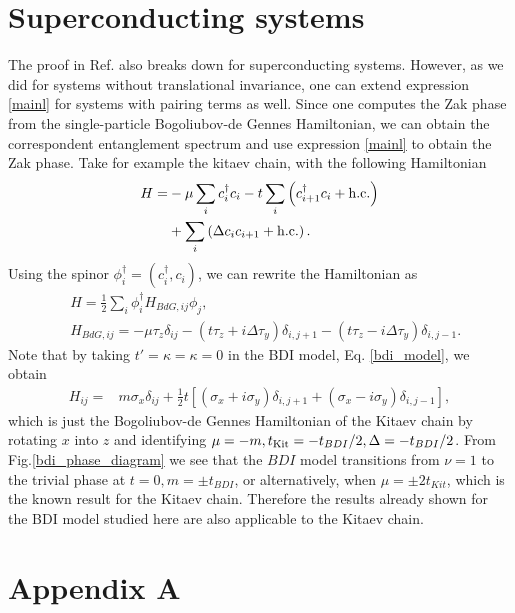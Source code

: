 \documentclass[twocolumn,amsmath,longbibliography,amssymb,superscriptaddress]{revtex4-1}
\begin{document}
\section{Superconducting systems}

The proof in Ref.\cite{Zaletel2014} also breaks down for superconducting systems. However, as we did for systems without translational invariance, one can extend expression \ref{mainl} for systems with pairing terms as well. Since one computes the Zak phase from the single-particle Bogoliubov-de Gennes Hamiltonian, we can obtain the correspondent entanglement spectrum and use expression \ref{mainl} to obtain the Zak phase. Take for example the kitaev chain, with the following Hamiltonian
\begin{align*}
H =& -\mu \sum_{i} c_i^\dagger c_i - t \sum_{i}\left( c_{i+1}^\dagger c_i + {\rm h.c.}\right) \\
&+  \sum_{i}\left( \Delta c_{i} c_{i+1} + {\rm h.c.}\right).
\end{align*}
Using the spinor $\phi_i^\dagger = (c_i^\dagger, c_i)$, we can rewrite the Hamiltonian as
\begin{align*}
&H = \frac{1}{2}\sum_i \phi^\dagger_i H_{BdG,ij} \phi_j,\\
&H_{BdG,ij} = -\mu \tau_z \delta_{ij} - (t \tau_z + i\Delta \tau_y )\delta_{i,j+1}- (t \tau_z - i\Delta \tau_y)\delta_{i,j-1}.
\end{align*}
Note that by taking $t' = \kappa = \kappa = 0$ in the BDI model, Eq. \ref{bdi_model}, we obtain
\begin{align*}
H_{ij} =& m \sigma_x\delta_{ij} + \frac{1}{2} t \left[(\sigma_x + i \sigma_y)\delta_{i,j+1} + (\sigma_x - i \sigma_y) \delta_{i,j-1} \right],
\end{align*}
which is just the Bogoliubov-de Gennes Hamiltonian of the Kitaev chain by rotating $x$ into $z$ and identifying $\mu = -m, t_{\rm Kit} = -t_{BDI}/2, \Delta = -t_{BDI}/2 $. From Fig.\ref{bdi_phase_diagram} we see that the $BDI$ model transitions from $\nu = 1$ to the trivial phase at $t=0, m=\pm t_{BDI}$, or alternatively, when $\mu = \pm 2 t_{Kit}$, which is the known result for the Kitaev chain. Therefore the results already shown for the BDI model studied here are also applicable to the Kitaev chain.  


	

	
\appendix

\section{Appendix A}
	
\end{document}
